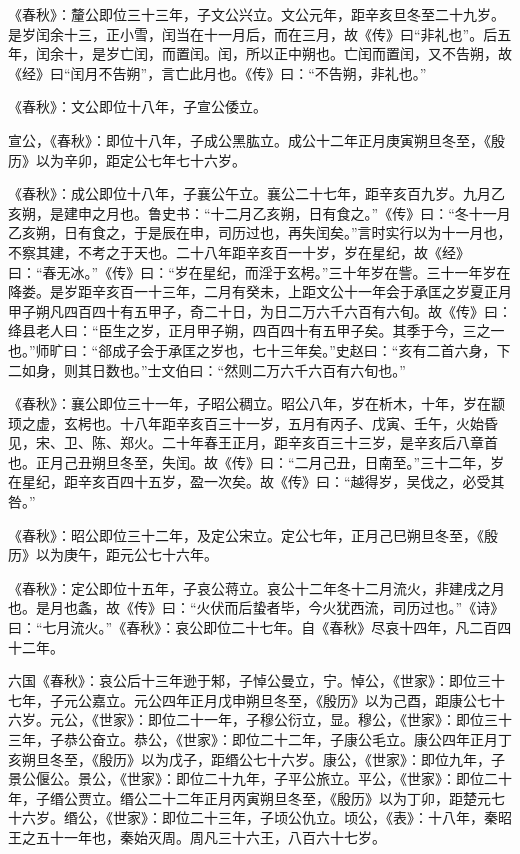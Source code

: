 \documentclass[12pt,UTF8]{ctexbook}
\begin{document}
《春秋》：釐公即位三十三年，子文公兴立。文公元年，距辛亥旦冬至二十九岁。是岁闰余十三，正小雪，闰当在十一月后，而在三月，故《传》曰“非礼也”。后五年，闰余十，是岁亡闰，而置闰。闰，所以正中朔也。亡闰而置闰，又不告朔，故《经》曰“闰月不告朔”，言亡此月也。《传》曰：“不告朔，非礼也。”



《春秋》：文公即位十八年，子宣公倭立。



宣公，《春秋》：即位十八年，子成公黑肱立。成公十二年正月庚寅朔旦冬至，《殷历》以为辛卯，距定公七年七十六岁。



《春秋》：成公即位十八年，子襄公午立。襄公二十七年，距辛亥百九岁。九月乙亥朔，是建申之月也。鲁史书：“十二月乙亥朔，日有食之。”《传》曰：“冬十一月乙亥朔，日有食之，于是辰在申，司历过也，再失闰矣。”言时实行以为十一月也，不察其建，不考之于天也。二十八年距辛亥百一十岁，岁在星纪，故《经》曰：“春无冰。”《传》曰：“岁在星纪，而淫于玄枵。”三十年岁在訾。三十一年岁在降娄。是岁距辛亥百一十三年，二月有癸未，上距文公十一年会于承匡之岁夏正月甲子朔凡四百四十有五甲子，奇二十日，为日二万六千六百有六旬。故《传》曰：绛县老人曰：“臣生之岁，正月甲子朔，四百四十有五甲子矣。其季于今，三之一也。”师旷曰：“郤成子会于承匡之岁也，七十三年矣。”史赵曰：“亥有二首六身，下二如身，则其日数也。”士文伯曰：“然则二万六千六百有六旬也。”



《春秋》：襄公即位三十一年，子昭公稠立。昭公八年，岁在析木，十年，岁在颛顼之虚，玄枵也。十八年距辛亥百三十一岁，五月有丙子、戊寅、壬午，火始昏见，宋、卫、陈、郑火。二十年春王正月，距辛亥百三十三岁，是辛亥后八章首也。正月己丑朔旦冬至，失闰。故《传》曰：“二月己丑，日南至。”三十二年，岁在星纪，距辛亥百四十五岁，盈一次矣。故《传》曰：“越得岁，吴伐之，必受其咎。”



《春秋》：昭公即位三十二年，及定公宋立。定公七年，正月己巳朔旦冬至，《殷历》以为庚午，距元公七十六年。



《春秋》：定公即位十五年，子哀公蒋立。哀公十二年冬十二月流火，非建戌之月也。是月也螽，故《传》曰：“火伏而后蛰者毕，今火犹西流，司历过也。”《诗》曰：“七月流火。”《春秋》：哀公即位二十七年。自《春秋》尽哀十四年，凡二百四十二年。



六国《春秋》：哀公后十三年逊于邾，子悼公曼立，宁。悼公，《世家》：即位三十七年，子元公嘉立。元公四年正月戊申朔旦冬至，《殷历》以为己酉，距康公七十六岁。元公，《世家》：即位二十一年，子穆公衍立，显。穆公，《世家》：即位三十三年，子恭公奋立。恭公，《世家》：即位二十二年，子康公毛立。康公四年正月丁亥朔旦冬至，《殷历》以为戊子，距缗公七十六岁。康公，《世家》：即位九年，子景公偃公。景公，《世家》：即位二十九年，子平公旅立。平公，《世家》：即位二十年，子缗公贾立。缗公二十二年正月丙寅朔旦冬至，《殷历》以为丁卯，距楚元七十六岁。缗公，《世家》：即位二十三年，子顷公仇立。顷公，《表》：十八年，秦昭王之五十一年也，秦始灭周。周凡三十六王，八百六十七岁。
\end{document}
